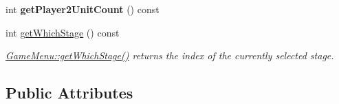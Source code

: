 \begin{DoxyCompactItemize}
\item 
int {\bfseries get\+Player2\+Unit\+Count} () const \hypertarget{class_game_menu_a9fd03816511faec236d787298237b231}{}\label{class_game_menu_a9fd03816511faec236d787298237b231}

\item 
int \hyperlink{class_game_menu_a45729234e7d5e250608217f0b24ac8da}{get\+Which\+Stage} () const 
\begin{DoxyCompactList}\small\item\em \hyperlink{class_game_menu_a45729234e7d5e250608217f0b24ac8da}{Game\+Menu\+::get\+Which\+Stage()} returns the index of the currently selected stage. \end{DoxyCompactList}\end{DoxyCompactItemize}
\subsection*{Public Attributes}
